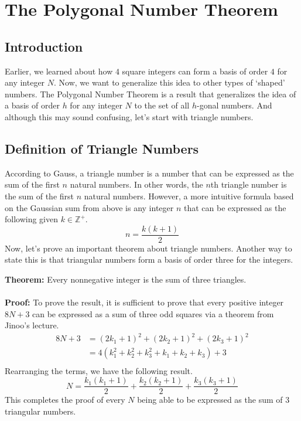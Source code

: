 \documentclass[8pt]{extarticle}
\begin{document}
\section{The Polygonal Number Theorem}
\subsection{Introduction}
Earlier, we learned about how $4$ square integers can form a basis of order $4$ for any integer $N$. Now, we want to generalize this idea to other types of `shaped' numbers. The Polygonal Number Theorem is a result that generalizes the idea of a basis of order $h$ for any integer $N$ to the set of all $h$-gonal numbers. And although this may sound confusing, let's start with triangle numbers.
\subsection{Definition of Triangle Numbers}
According to Gauss, a triangle number is a number that can be expressed as the sum of the first $n$ natural numbers. In other words, the $n$th triangle number is the sum of the first $n$ natural numbers. However, a more intuitive formula based on the Gaussian sum from above is any integer $n$ that can be expressed as the following given $k \in \mathbb{Z}^+$.
$$
n = \frac{k(k+1)}{2}
$$
Now, let's prove an important theorem about triangle numbers. Another way to state this is that triangular numbers form a basis of order three for the integers.
\begin{boxedsection}
    \textbf{Theorem:} Every nonnegative integer is the sum of three triangles.\\
    \\
    \textbf{Proof:} To prove the result, it is sufficient to prove that every positive integer $8N + 3$ can be expressed as a sum of three odd squares via a theorem from Jinoo's lecture. 
    \begin{align*}
        8N + 3 &= (2k_1 + 1)^2 + (2k_2 + 1)^2 + (2k_3 + 1)^2 \\
        &= 4(k_1^2 + k_2^2 + k_3^2 + k_1 + k_2 + k_3) + 3\\
    \end{align*}
    Rearranging the terms, we have the following result.
    $$
    N = \frac{k_1(k_1+1)}{2} + \frac{k_2(k_2+1)}{2} + \frac{k_3(k_3+1)}{2}
    $$
    This completes the proof of every $N$ being able to be expressed as the sum of $3$ triangular numbers.
\end{boxedsection}
\end{document}
